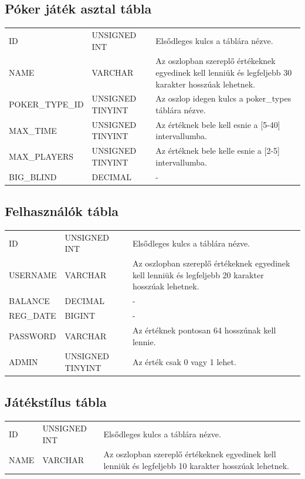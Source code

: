 \subsection{Póker játék asztal tábla}
\begin{tabular}{| C{4.7cm} | C{4.7cm} | C{4.7cm} |}
\hline
   &  &  \\ \hline
  ID & UNSIGNED INT & Elsődleges kulcs a táblára nézve. \\ \hline
  NAME & VARCHAR & Az oszlopban szereplő értékeknek egyedinek kell lenniük és legfeljebb 30 karakter hosszúak lehetnek.  \\ \hline
  POKER\_TYPE\_ID & UNSIGNED TINYINT & Az oszlop idegen kulcs a poker\_types táblára nézve. \\ \hline
  MAX\_TIME & UNSIGNED TINYINT & Az értéknek bele kell esnie a [5-40] intervallumba. \\ \hline
  MAX\_PLAYERS & UNSIGNED TINYINT & Az értéknek bele kelle esnie a [2-5] intervallumba. \\ \hline
  BIG\_BLIND & DECIMAL & - \\ \hline
\end{tabular}

\subsection{Felhasználók tábla}
\begin{tabular}{| C{4.7cm} | C{4.7cm} | C{4.7cm} |}
\hline
   &  &  \\ \hline
  ID & UNSIGNED INT & Elsődleges kulcs a táblára nézve. \\ \hline
  USERNAME & VARCHAR & Az oszlopban szereplő értékeknek egyedinek kell lenniük és legfeljebb 20 karakter hosszúak lehetnek.  \\ \hline
  BALANCE & DECIMAL & - \\ \hline
  REG\_DATE & BIGINT & - \\ \hline
  PASSWORD & VARCHAR & Az értéknek pontosan 64 hosszúnak kell lennie. \\ \hline
  ADMIN & UNSIGNED TINYINT & Az érték csak 0 vagy 1 lehet. \\ \hline
\end{tabular}

\subsection{Játékstílus tábla}
\begin{tabular}{| C{4.7cm} | C{4.7cm} | C{4.7cm} |}
\hline
   &  &  \\ \hline
  ID & UNSIGNED INT & Elsődleges kulcs a táblára nézve. \\ \hline
  NAME & VARCHAR & Az oszlopban szereplő értékeknek egyedinek kell lenniük és legfeljebb 10 karakter hosszúak lehetnek.  \\ \hline
\end{tabular}

